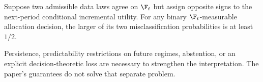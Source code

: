 \begin{proposition}\label{prop:impossibility}
Suppose two admissible data laws agree on $\F_t$ but assign opposite signs to the next-period conditional incremental utility. For any binary $\F_t$-measurable allocation decision, the larger of its two misclassification probabilities is at least $1/2$.
\end{proposition}
Persistence, predictability restrictions on future regimes, abstention, or an explicit decision-theoretic loss are necessary to strengthen the interpretation. The paper's guarantees do not solve that separate problem.

